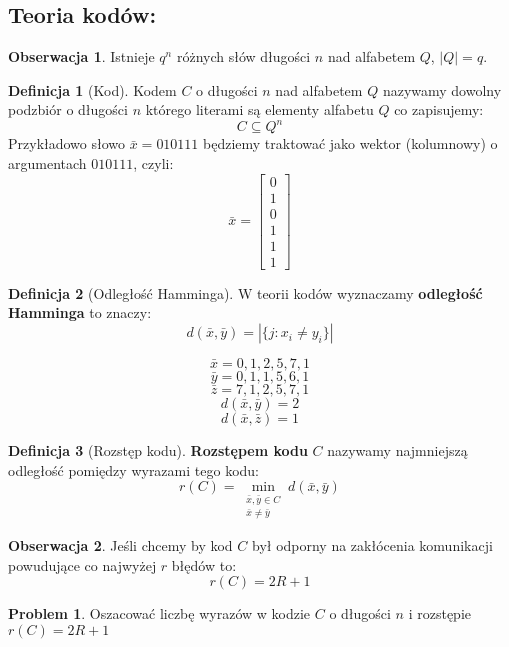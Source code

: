 \documentclass[a4paper,12pt]{article}
\theoremstyle{definition}%
\newtheorem*{observation*}{Obserwacja}
\theoremstyle{definition}
\newtheorem{definition}{Definicja}%
\theoremstyle{problem}
\newtheorem*{problem*}{Problem}
\begin{document}
\subsection{Teoria kodów:}
\begin{observation*}
Istnieje $q^n$ różnych słów długości $n$ nad alfabetem $Q$, $|Q|=q$.
\end{observation*}
\begin{definition}[Kod]
Kodem $C$ o długości $n$ nad alfabetem $Q$ nazywamy dowolny podzbiór o długości $n$ którego literami są elementy alfabetu $Q$ co zapisujemy: $$C\subseteq Q^n$$
Przykładowo słowo $\bar{x}=010111$ będziemy traktować jako wektor (kolumnowy) o argumentach $010111$, czyli: $$\bar{x}=\begin{bmatrix}
0\\1\\0\\1\\1\\1
\end{bmatrix}$$
\end{definition}
\begin{definition}[Odległość Hamminga]
W teorii kodów wyznaczamy \textbf{odległość Hamminga} to znaczy: $$d(\bar{x},\bar{y})=|\{j:x_i\neq y_i\}|$$
\begin{multicols}{2}
$$\bar{x}=0,1,2,5,7,1$$
$$\bar{y}=0,1,1,5,6,1$$
$$\bar{z}=7,1,2,5,7,1$$
\vfill\null
\columnbreak
$$d(\bar{x},\bar{y})=2$$
$$d(\bar{x},\bar{z})=1$$
\end{multicols}
\end{definition}

\begin{definition}[Rozstęp kodu]
\textbf{Rozstępem kodu} $C$ nazywamy najmniejszą odległość pomiędzy wyrazami tego kodu: $$r(C)=\min _{\begin{matrix}
\bar{x},\bar{y}\in C\\
\bar{x}\neq \bar{y}
\end{matrix}}d(\bar{x},\bar{y})$$
\end{definition}
\begin{observation*}
Jeśli chcemy by kod $C$ był odporny na zakłócenia komunikacji powudujące co najwyżej $r$ błędów to: $$r(C)=2R+1$$
\end{observation*}
\begin{problem*}
Oszacować liczbę wyrazów w kodzie $C$ o długości $n$ i rozstępie $r(C)=2R+1$
\end{problem*}
\end{document}
